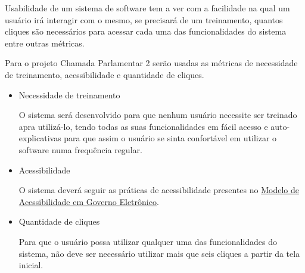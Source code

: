 Usabilidade de um sistema de software tem a ver com a facilidade na qual um usuário irá interagir com o mesmo, se precisará de um treinamento, quantos cliques são necessários para acessar cada uma das funcionalidades do sistema entre outras métricas.

Para o projeto Chamada Parlamentar 2 serão usadas as métricas de necessidade de treinamento, acessibilidade e quantidade de cliques.

\begin{itemize}

	\item{Necessidade de treinamento}

		O sistema será desenvolvido para que nenhum usuário necessite ser treinado apra utilizá-lo, tendo todas as suas funcionalidades em fácil acesso e auto-explicativas para que assim o usuário se sinta confortável em utilizar o software numa frequência regular.

	\item{Acessibilidade}

		O sistema deverá seguir as práticas de acessibilidade presentes no \href{http://www.governoeletronico.gov.br/acoes-e-projetos/e-MAG}{Modelo de Acessibilidade em Governo Eletrônico}\cite{eMAG}.

	\item{Quantidade de cliques}

		Para que o usuário possa utilizar qualquer uma das funcionalidades do sistema, não deve ser necessário utilizar mais que seis cliques a partir da tela inicial.

\end{itemize}